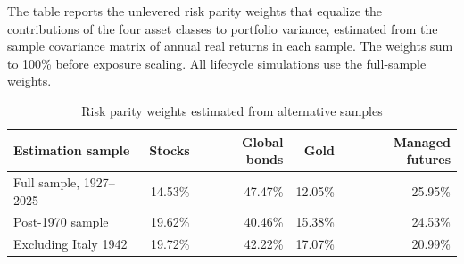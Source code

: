 \begin{table}[p]\centering
\caption{Risk parity weights estimated from alternative samples}\label{tab:erc-calibration}
\begin{minipage}{\linewidth}\small The table reports the unlevered risk parity weights that equalize the contributions of the four asset classes to portfolio variance, estimated from the sample covariance matrix of annual real returns in each sample. The weights sum to 100\% before exposure scaling. All lifecycle simulations use the full-sample weights.\end{minipage}
\medskip

{\small\setlength{\tabcolsep}{4pt}\begin{tabular}{lrrrr}\toprule
Estimation sample & Stocks & Global bonds & Gold & Managed futures \\ \midrule
Full sample, 1927--2025 & 14.53\% & 47.47\% & 12.05\% & 25.95\% \\
Post-1970 sample & 19.62\% & 40.46\% & 15.38\% & 24.53\% \\
Excluding Italy 1942 & 19.72\% & 42.22\% & 17.07\% & 20.99\% \\
\bottomrule\end{tabular}}
\end{table}
